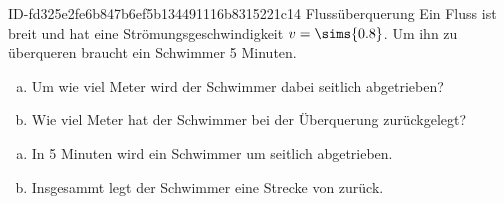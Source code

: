\begin{exercise}
      {ID-fd325e2fe6b847b6ef5b134491116b8315221c14}
      {Flussüberquerung}
  \ifproblem\problem
    Ein Fluss ist  breit und hat eine Strömungsgeschwindigkeit
    $v=\sims{0.8}$. Um ihn zu überqueren braucht ein Schwimmer \num{5} Minuten.
    \begin{enumerate}[a)]
      \item Um wie viel Meter wird der Schwimmer dabei seitlich abgetrieben?
      \item Wie viel Meter hat der Schwimmer bei der Überquerung zurückgelegt?
    \end{enumerate}
  \fi
  \ifoutcome\outcome
    \begin{enumerate}[a)]
      \item In \num{5} Minuten wird ein Schwimmer um  seitlich abgetrieben.
      \item Insgesammt legt der Schwimmer eine Strecke von  zurück.
    \end{enumerate}
  \fi
\end{exercise}

